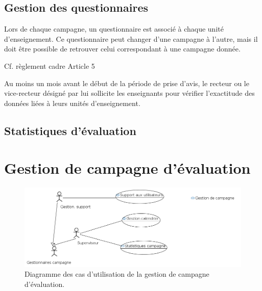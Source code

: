 \documentclass[a4paper,11pt]{report}
\begin{document}
\subsection{Gestion des questionnaires}
Lors de chaque campagne, un questionnaire est associé à chaque unité d'enseignement.
Ce questionnaire peut changer d'une campagne à l'autre, mais il doit être possible de retrouver celui correspondant à une campagne donnée.

Cf. règlement cadre Article 5

Au moins un mois avant le début de la période de prise d'avis, le recteur ou le vice-recteur désigné par lui sollicite les enseignants pour vérifier l'exactitude des données liées à leurs unités d'enseignement.






\subsection{Statistiques d'évaluation}


















\newpage
\section{Gestion de campagne d'évaluation}

\begin{figure}[ht]
\includegraphics[width=\linewidth]{workspace/evalens-usecases/gestion_campagne.png}
\caption{Diagramme des cas d'utilisation de la gestion de campagne d'évaluation.}
\label{fig:usecase-campagne}
\end{figure}
\end{document}
